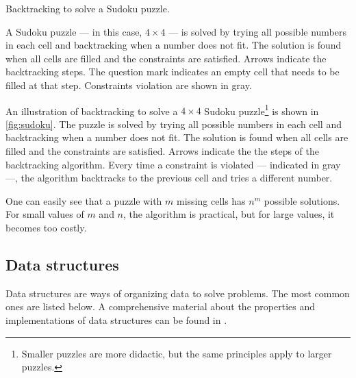 \begin{figurebox}[label=fig:sudoku]{Backtracking to solve a Sudoku puzzle.}
  \tcblower
  A Sudoku puzzle --- in this case, $4 \times 4$ --- is solved by trying all possible
  numbers in each cell and backtracking when a number does not fit.  The solution is found
  when all cells are filled and the constraints are satisfied.  Arrows indicate the
  backtracking steps.  The question mark indicates an empty cell that needs to be filled
  at that step.  Constraints violation are shown in gray.
\end{figurebox}

An illustration of backtracking to solve a $4 \times 4$ Sudoku puzzle\footnote{%
Smaller puzzles are more didactic, but the same principles apply to larger puzzles.}
is shown in \cref{fig:sudoku}.
The puzzle is solved by trying all possible numbers in each cell and backtracking when a
number does not fit.  The solution is found when all cells are filled and the constraints
are satisfied.  Arrows indicate the the steps of the backtracking algorithm.  Every time a
constraint is violated --- indicated in gray ---, the algorithm backtracks to the previous
cell and tries a different number.

One can easily see that a puzzle with $m$ missing cells has $n^m$ possible solutions.  For
small values of $m$ and $n$, the algorithm is practical, but for large values, it becomes
too costly.

\subsection{Data structures}

Data structures are ways of organizing data to solve problems.  The most common ones
are listed below.  A comprehensive material about the properties and implementations of
data structures can be found in \textcite{Cormen2022}.

